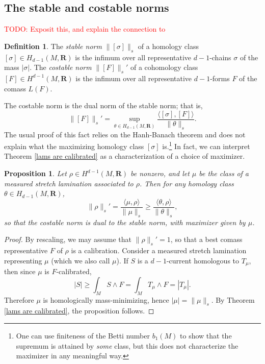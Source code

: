 \documentclass[reqno,11pt]{amsart}
\newcommand{\RR}{\mathbf{R}}
\newcommand{\dfn}[1]{\emph{#1}\index{#1}}
\newtheorem{proposition}[theorem]{Proposition}
\theoremstyle{definition}
\newtheorem{definition}[theorem]{Definition}
\numberwithin{equation}{section}
\newcommand\todo[1]{\textcolor{red}{TODO: #1}}
\begin{document}
\subsection{The stable and costable norms}
\todo{Exposit this, and explain the connection to \cite{Freedman_2016}}

\begin{definition}
The \dfn{stable norm} $\|[\sigma]\|_s$ of a homology class $[\sigma] \in H_{d - 1}(M, \RR)$ is the infimum over all representative $d - 1$-chains $\sigma$ of the mass $|\sigma|$.
The \dfn{costable norm} $\|[F]\|_s'$ of a cohomology class $[F] \in H^{d - 1}(M, \RR)$ is the infimum over all representative $d - 1$-forms $F$ of the comass $L(F)$.
\end{definition}

The costable norm is the dual norm of the stable norm; that is, 
$$\|[F]\|_s' = \sup_{\theta \in H_{d - 1}(M, \RR)} \frac{\langle [\sigma], [F]\rangle}{\|\theta\|_s}.$$
The usual proof of this fact \cite[Theorem 3.8]{AUER20011095} relies on the Hanh-Banach theorem and does not explain what the maximizing homology class $[\sigma]$ is.\footnote{One can use finiteness of the Betti number $b_1(M)$ to show that the supremum is attained by \emph{some} class, but this does not characterize the maximizer in any meaningful way.}
In fact, we can interpret Theorem \ref{lams are calibrated} as a characterization of a choice of maximizer.

\begin{proposition}
Let $\rho \in H^{d - 1}(M, \RR)$ be nonzero, and let $\mu$ be the class of a measured stretch lamination associated to $\rho$.
Then for any homology class $\theta \in H_{d - 1}(M, \RR)$,
$$\|\rho\|_s' = \frac{\langle \mu, \rho\rangle}{\|\mu\|_s} \geq \frac{\langle \theta, \rho\rangle}{\|\theta\|_s},$$
so that the costable norm is dual to the stable norm, with maximizer given by $\mu$.
\end{proposition}
\begin{proof}
By rescaling, we may assume that $\|\rho\|_s' = 1$, so that a best comass representative $F$ of $\rho$ is a calibration.
Consider a measured stretch lamination representing $\mu$ (which we also call $\mu$).
If $S$ is a $d-1$-current homologous to $T_\mu$, then since $\mu$ is $F$-calibrated,
$$|S| \geq \int_M S \wedge F = \int_M T_\mu \wedge F = |T_\mu|.$$
Therefore $\mu$ is homologically mass-minimizing, hence $|\mu| = \|\mu\|_s$.
By Theorem \ref{lams are calibrated}, the proposition follows.
\end{proof}
\end{document}
